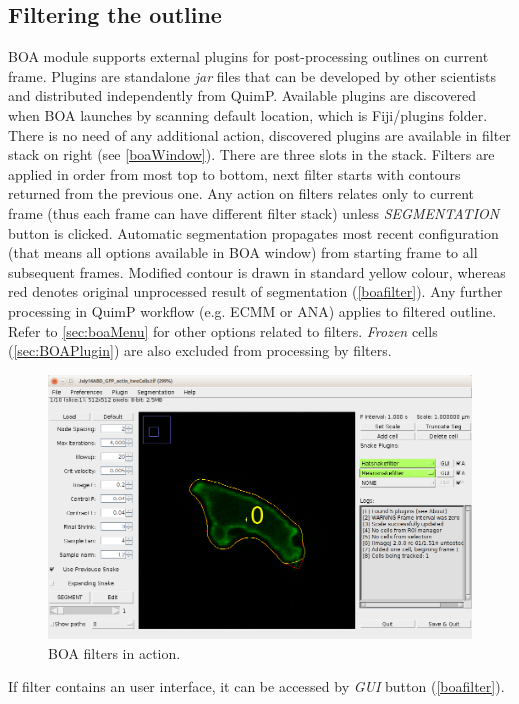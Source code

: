 \documentclass[a4paper,12pt]{article}
\begin{document}
\subsection{Filtering the outline}
\label{sec:boaFilters}
BOA module supports external plugins for post-processing outlines on current frame. Plugins are standalone \textit{jar} files that can be developed by other scientists and distributed independently from QuimP. Available plugins are discovered when BOA launches by scanning default location, which is Fiji/plugins folder. There is no need of any additional action, discovered plugins are available in filter stack on right (see \autoref{boaWindow}). There are three slots in the stack. Filters are applied in order from most top to bottom, next filter starts with contours returned from the previous one. Any action on filters relates only to current frame (thus each frame can have different filter stack) unless \textit{SEGMENTATION} button is clicked. Automatic segmentation propagates most recent configuration (that means all options available in BOA window) from starting frame to all subsequent frames. Modified contour is drawn in standard yellow colour, whereas red denotes original unprocessed result of segmentation (\autoref{boafilter}). Any further processing in QuimP workflow (e.g. ECMM or ANA) applies to filtered outline. Refer to \autoref{sec:boaMenu} for other options related to filters. \textit{Frozen} cells (\autoref{sec:BOAPlugin}) are also excluded from processing by filters.
\begin{figure}[ht]
	\centering
	\includegraphics[height=7cm]{boafilter.png} %
	\caption{BOA filters in action.}
	\label{boafilter}
\end{figure}

If filter contains an user interface, it can be accessed by \textit{GUI} button (\autoref{boafilter}).
\end{document}
